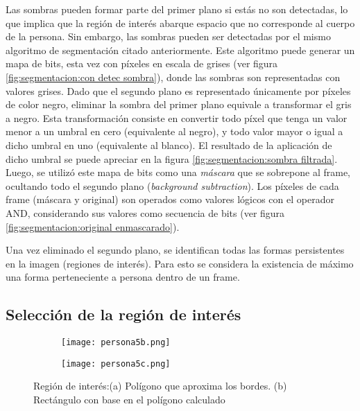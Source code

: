 \documentclass[../memoria.tex]{subfiles}
\begin{document}
Las sombras pueden formar parte del primer plano si estás no son detectadas, lo que implica que la región de interés abarque espacio que no corresponde al cuerpo de la persona. Sin embargo, las sombras pueden ser detectadas por el mismo algoritmo de segmentación citado anteriormente. Este algoritmo puede generar un mapa de bits, esta vez con píxeles en escala de grises (ver figura \ref{fig:segmentacion:con detec sombra}), donde las sombras son representadas con valores grises. Dado que el segundo plano es representado únicamente por píxeles de color negro, eliminar la sombra del primer plano equivale a transformar el gris a negro. Esta transformación consiste en convertir todo píxel que tenga un valor menor a un umbral en cero (equivalente al negro), y todo valor mayor o igual a dicho umbral en uno (equivalente al blanco). El resultado de la aplicación de dicho umbral se puede apreciar en la figura \ref{fig:segmentacion:sombra filtrada}. Luego, se utilizó este mapa de bits como una \emph{máscara} que se sobrepone al frame, ocultando todo el segundo plano (\emph{background subtraction}). Los píxeles de cada frame (máscara y original) son operados como valores lógicos con el operador AND, considerando sus valores como secuencia de bits (ver figura \ref{fig:segmentacion:original enmascarado}).

Una vez eliminado el segundo plano, se identifican todas las formas persistentes en la imagen (regiones de interés). Para esto se considera la existencia de máximo una forma perteneciente a persona dentro de un frame. 

\subsection{Selección de la región de interés}
\label{seleccion roi}

\begin{figure}
    \centering
      \begin{subfigure}{0.45\textwidth}
        \texttt{[image: persona5b.png]}
          \caption{}
          \label{fig:seleccion roi:poligono}
      \end{subfigure}
      \hfill
      \begin{subfigure}{0.45\textwidth}
        \texttt{[image: persona5c.png]}
          \caption{}
          \label{fig:seleccion roi:rectangulo}
      \end{subfigure}
\caption{
\label{fig:seleccion roi}%
Región de interés:(a) Polígono que aproxima los bordes. (b) Rectángulo con base en el polígono calculado}
\end{figure}
\end{document}
